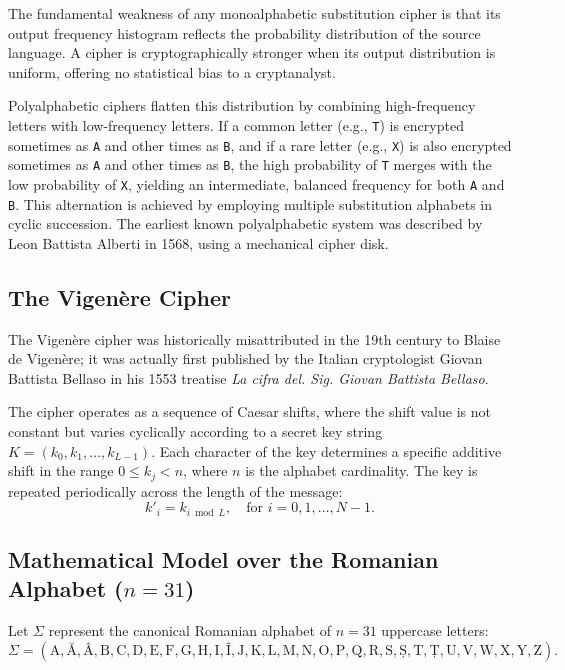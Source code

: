 \documentclass{labreport}
\begin{document}
The fundamental weakness of any monoalphabetic substitution cipher is that its output frequency histogram reflects the probability distribution of the source language. A cipher is cryptographically stronger when its output distribution is uniform, offering no statistical bias to a cryptanalyst.

Polyalphabetic ciphers flatten this distribution by combining high-frequency letters with low-frequency letters. If a common letter (e.g., \texttt{T}) is encrypted sometimes as \texttt{A} and other times as \texttt{B}, and if a rare letter (e.g., \texttt{X}) is also encrypted sometimes as \texttt{A} and other times as \texttt{B}, the high probability of \texttt{T} merges with the low probability of \texttt{X}, yielding an intermediate, balanced frequency for both \texttt{A} and \texttt{B}. This alternation is achieved by employing multiple substitution alphabets in cyclic succession. The earliest known polyalphabetic system was described by Leon Battista Alberti in 1568, using a mechanical cipher disk.

\subsection{The Vigenère Cipher}

The Vigenère cipher was historically misattributed in the 19th century to Blaise de Vigenère; it was actually first published by the Italian cryptologist Giovan Battista Bellaso in his 1553 treatise \textit{La cifra del. Sig. Giovan Battista Bellaso}.

The cipher operates as a sequence of Caesar shifts, where the shift value is not constant but varies cyclically according to a secret key string $K = (k_0, k_1, \dots, k_{L-1})$. Each character of the key determines a specific additive shift in the range $0 \le k_j < n$, where $n$ is the alphabet cardinality. The key is repeated periodically across the length of the message:
\begin{equation}
    k'_i = k_{i \bmod L}, \quad \text{for } i = 0, 1, \dots, N-1.
\end{equation}

\subsection[Mathematical Model over the Romanian Alphabet (n = 31)]{Mathematical Model over the Romanian Alphabet ($n = 31$)}

Let $\Sigma$ represent the canonical Romanian alphabet of $n = 31$ uppercase letters:
\begin{equation}
    \Sigma = (\text{A}, \text{Ă}, \text{Â}, \text{B}, \text{C}, \text{D}, \text{E}, \text{F}, \text{G}, \text{H}, \text{I}, \text{Î}, \text{J}, \text{K}, \text{L}, \text{M}, \text{N}, \text{O}, \text{P}, \text{Q}, \text{R}, \text{S}, \text{Ș}, \text{T}, \text{Ț}, \text{U}, \text{V}, \text{W}, \text{X}, \text{Y}, \text{Z}).
\end{equation}
\end{document}
